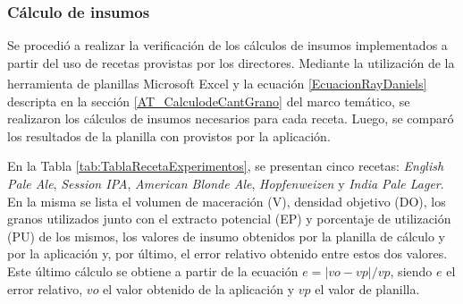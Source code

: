 
\subsubsection{Cálculo de insumos}

\par Se procedió a realizar la verificación de los cálculos de insumos implementados a partir del uso de recetas provistas por los directores. Mediante la utilización de la herramienta de planillas Microsoft \textsuperscript{\textregistered} Excel y la ecuación \ref{EcuacionRayDaniels} descripta en la sección \ref{AT_CalculodeCantGrano} del marco temático, se realizaron los cálculos de insumos necesarios para cada receta. Luego, se comparó los resultados de la planilla con provistos por la aplicación.

\par En la Tabla \ref{tab:TablaRecetaExperimentos}, se presentan cinco recetas: \textit{English Pale Ale}, \textit{Session IPA}, \textit{American Blonde Ale}, \textit{Hopfenweizen} y \textit{India Pale Lager}. 
En la misma se lista el volumen de maceración (V), densidad objetivo (DO), los granos utilizados junto con el extracto potencial (EP) y porcentaje de utilización (PU) de los mismos, los valores de insumo obtenidos por la planilla de cálculo y por la aplicación y, por último, el error relativo obtenido entre estos dos valores. Este último cálculo se obtiene a partir de la ecuación $ e = |vo-vp|/vp $, siendo $e$ el error relativo, $vo$ el valor obtenido de la aplicación y $vp$ el valor de planilla.

